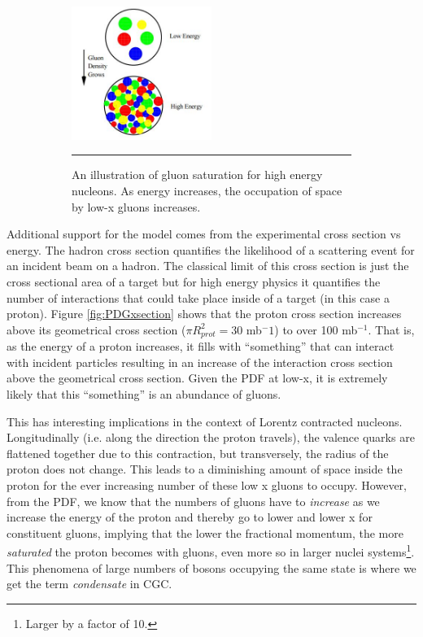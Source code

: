 \begin{figure}
\centering
\ContinuedFloat
\begin{subfigure}[h]{0.8\textwidth}
  \centering
    \includegraphics[width=0.5\textwidth]{Figures/gluondensityCGC.jpg}
  \caption[Illustration of gluon saturation in Color-Glass Condensate.]{An illustration of gluon saturation for high energy nucleons\citep{McLerran:2001sr}. As energy increases, the occupation of space by low-x gluons increases.}
  \label{fig:gluonsaturation}
    \rule{35em}{0.5pt}
\end{subfigure}
\caption{}
\end{figure}

Additional support for the model comes from the experimental cross section vs energy. The hadron cross section quantifies the likelihood of a scattering event for an incident beam on a hadron. The classical limit of this cross section is just the cross sectional area of a target but for high energy physics it quantifies the number of interactions that could take place inside of a target (in this case a proton). Figure \ref{fig:PDGxsection} shows that the proton cross section increases above its geometrical cross section ($\pi R_{prot}^2 = $30 mb${^-1}$) to over 100 mb$^{-1}$\citep{PDGcrosssection}\citep{Itakura2012}. That is, as the energy of a proton increases, it fills with ``something'' that can interact with incident particles resulting in an increase of the interaction cross section above the geometrical cross section. Given the PDF at low-x, it is extremely likely that this ``something'' is an abundance of gluons.

This has interesting implications in the context of Lorentz contracted nucleons. Longitudinally (i.e. along the direction the proton travels), the valence quarks are flattened together due to this contraction, but transversely, the radius of the proton does not change. This leads to a diminishing amount of space inside the proton for the ever increasing number of these low x gluons to occupy. However, from the PDF, we know that the numbers of gluons have to \textit{increase} as we increase the energy of the proton and thereby go to lower and lower x for constituent gluons, implying that the lower the fractional momentum, the more \textit{saturated} the proton becomes with gluons, even more so in larger nuclei systems\footnote{Larger by a factor of 10.}. This phenomena of large numbers of bosons occupying the same state is where we get the term \textit{condensate} in CGC.

